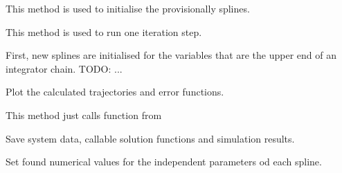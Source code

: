 \documentclass[letterpaper,10pt,english]{sphinxmanual}
\begin{document}
\begin{fulllineitems}

\begin{fulllineitems}
\label{pytrajectory:pytrajectory.trajectory.Trajectory.initSplines}
This method is used to initialise the provisionally splines.

\end{fulllineitems}


\begin{fulllineitems}
\label{pytrajectory:pytrajectory.trajectory.Trajectory.iterate}
This method is used to run one iteration step.

First, new splines are initialised for the variables that are the upper end of an
integrator chain.
TODO: ...

\end{fulllineitems}


\begin{fulllineitems}
\label{pytrajectory:pytrajectory.trajectory.Trajectory.plot}
Plot the calculated trajectories and error functions.

This method just calls {\hyperref[pytrajectory:pytrajectory.trajectory.Trajectory.plot]{}} function from 

\end{fulllineitems}


\begin{fulllineitems}
\label{pytrajectory:pytrajectory.trajectory.Trajectory.save}
Save system data, callable solution functions and simulation results.

\end{fulllineitems}


\begin{fulllineitems}
\label{pytrajectory:pytrajectory.trajectory.Trajectory.setCoeff}
Set found numerical values for the independent parameters od each spline.


\end{fulllineitems}
\end{fulllineitems}
\end{document}
